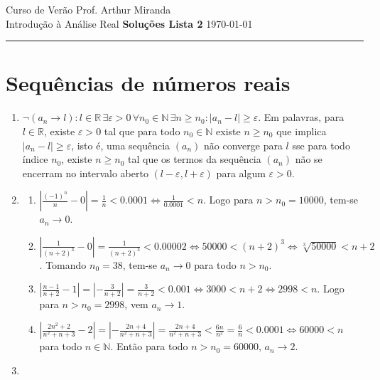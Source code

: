 \documentclass{article}
\begin{document}
\noindent
Curso de Verão \hfill Prof. Arthur Miranda \\
\noindent
Introdução à Análise Real \hfill \textbf{\Large Soluções Lista 2} \hfill \today
\vspace{0.5mm}
\hrule

\section*{Sequências de números reais}

\begin{enumerate}
    \item [\textbf{E1}] \(\neg(a_n \to l): l \in \mathbb{R} \, \exists \varepsilon > 0 \, \forall n_0 \in \mathbb{N} \, \exists n \geq n_0 : |a_n - l| \geq \varepsilon\). Em palavras, para \(l \in \mathbb{R}\), existe \(\varepsilon > 0\) tal que para todo \(n_0 \in \mathbb{N}\) existe \(n \geq n_0\) que implica \(|a_n - l| \geq \varepsilon\), isto é, uma sequência \((a_n)\) não converge para \(l\) sse para todo índice \(n_0\), existe \(n \geq n_0\) tal que os termos da sequência \((a_n)\) não se encerram no intervalo aberto \((l-\varepsilon, l+\varepsilon)\) para algum \(\varepsilon>0\).
    \item [\textbf{E2}]
        \begin{enumerate}
            \item [(a)] \(\displaystyle\left\vert \frac{(-1)^n}{n} - 0 \right\vert = \frac{1}{n} < 0.0001 \iff \frac{1}{0.0001} < n\). Logo para \(n > n_0 = 10000\), tem-se \(a_n \to 0\).
            \item [(b)] \(\displaystyle\left\vert \frac{1}{(n+2)^3} - 0 \right\vert = \frac{1}{(n+2)^3} < 0.00002 \iff 50000 < (n+2)^3 \iff \sqrt[3]{50000} < n+2\). Tomando \(n_0 = 38\), tem-se \(a_n \to 0\) para todo \(n > n_0\).
            \item [(c)] \(\displaystyle\left\vert \frac{n-1}{n+2} - 1 \right\vert = \left\vert -\frac{3}{n+2} \right\vert = \frac{3}{n+2} < 0.001 \iff 3000 < n+2 \iff 2998 < n\). Logo para \(n > n_0 = 2998\), vem \(a_n \to 1\).
            \item [(d)] \(\displaystyle\left\vert \frac{2n^2+2}{n^2+n+3} -2 \right\vert = \left\vert -\frac{2n+4}{n^2+n+3} \right\vert = \frac{2n+4}{n^2+n+3} < \frac{6n}{n^2} = \frac{6}{n} < 0.0001 \iff 60000 < n\) para todo \(n \in \mathbb{N}\). Então para todo \(n > n_0 = 60000\), \(a_n \to 2\).
        \end{enumerate}
    \item [\textbf{E3}]
        \begin{enumerate}

\end{enumerate}
\end{enumerate}
\end{document}
